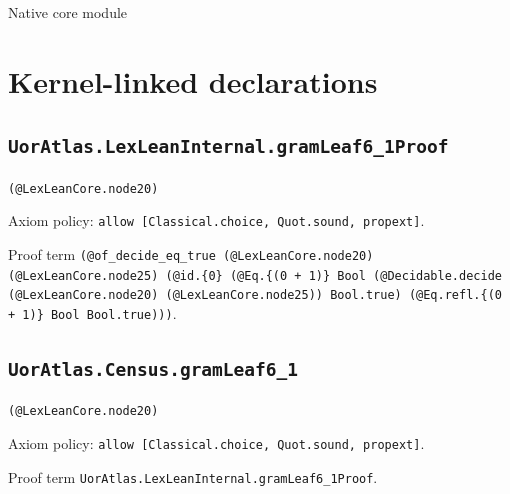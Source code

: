 \documentclass[11pt]{article}
\begin{document}
\begin{center}{\LARGE Native core module}\end{center}
\section*{Kernel-linked declarations}
\subsection*{\texttt{UorAtlas.LexLeanInternal.gramLeaf6\_1Proof}}
\noindent\texttt{(@LexLeanCore.node20)}\par
\noindent Axiom policy: \texttt{allow [Classical.choice, Quot.sound, propext]}.\par
\noindent Proof term \texttt{(@of\_decide\_eq\_true (@LexLeanCore.node20) (@LexLeanCore.node25) (@id.\{0\} (@Eq.\{(0 + 1)\} Bool (@Decidable.decide (@LexLeanCore.node20) (@LexLeanCore.node25)) Bool.true) (@Eq.refl.\{(0 + 1)\} Bool Bool.true)))}.\par
\subsection*{\texttt{UorAtlas.Census.gramLeaf6\_1}}
\noindent\texttt{(@LexLeanCore.node20)}\par
\noindent Axiom policy: \texttt{allow [Classical.choice, Quot.sound, propext]}.\par
\noindent Proof term \texttt{UorAtlas.LexLeanInternal.gramLeaf6\_1Proof}.\par
\end{document}
